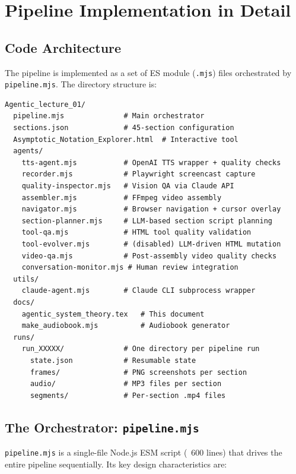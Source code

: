 \documentclass[12pt,a4paper]{article}
\begin{document}
\section{Pipeline Implementation in Detail}
\label{sec:impl}

\subsection{Code Architecture}

The pipeline is implemented as a set of ES module (\texttt{.mjs}) files
orchestrated by \texttt{pipeline.mjs}. The directory structure is:

\begin{lstlisting}[language={},caption=Project structure]
Agentic_lecture_01/
  pipeline.mjs              # Main orchestrator
  sections.json             # 45-section configuration
  Asymptotic_Notation_Explorer.html  # Interactive tool
  agents/
    tts-agent.mjs           # OpenAI TTS wrapper + quality checks
    recorder.mjs            # Playwright screencast capture
    quality-inspector.mjs   # Vision QA via Claude API
    assembler.mjs           # FFmpeg video assembly
    navigator.mjs           # Browser navigation + cursor overlay
    section-planner.mjs     # LLM-based section script planning
    tool-qa.mjs             # HTML tool quality validation
    tool-evolver.mjs        # (disabled) LLM-driven HTML mutation
    video-qa.mjs            # Post-assembly video quality checks
    conversation-monitor.mjs # Human review integration
  utils/
    claude-agent.mjs        # Claude CLI subprocess wrapper
  docs/
    agentic_system_theory.tex   # This document
    make_audiobook.mjs          # Audiobook generator
  runs/
    run_XXXXX/              # One directory per pipeline run
      state.json            # Resumable state
      frames/               # PNG screenshots per section
      audio/                # MP3 files per section
      segments/             # Per-section .mp4 files
\end{lstlisting}

\subsection{The Orchestrator: \texttt{pipeline.mjs}}

\texttt{pipeline.mjs} is a single-file Node.js ESM script (~600 lines) that
drives the entire pipeline sequentially. Its key design characteristics are:
\end{document}
